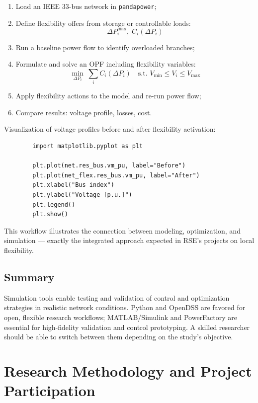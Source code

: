 \documentclass[11pt]{article}
\begin{document}
	\begin{enumerate}
		\item Load an IEEE 33-bus network in \texttt{pandapower};
		\item Define flexibility offers from storage or controllable loads:
		\[
		\Delta P_i^\text{max}, \; C_i(\Delta P_i)
		\]
		\item Run a baseline power flow to identify overloaded branches;
		\item Formulate and solve an OPF including flexibility variables:
		\[
		\min_{\Delta P_i} \; \sum_i C_i(\Delta P_i)
		\quad \text{s.t. } V_\text{min} \le V_i \le V_\text{max}
		\]
		\item Apply flexibility actions to the model and re-run power flow;
		\item Compare results: voltage profile, losses, cost.
	\end{enumerate}
	
	Visualization of voltage profiles before and after flexibility activation:
	\begin{verbatim}
		import matplotlib.pyplot as plt
		
		plt.plot(net.res_bus.vm_pu, label="Before")
		plt.plot(net_flex.res_bus.vm_pu, label="After")
		plt.xlabel("Bus index")
		plt.ylabel("Voltage [p.u.]")
		plt.legend()
		plt.show()
	\end{verbatim}
	
	This workflow illustrates the connection between modeling, optimization, and simulation — exactly the integrated approach expected in RSE’s projects on local flexibility.
	
	\subsection*{Summary}
	
	Simulation tools enable testing and validation of control and optimization strategies in realistic network conditions.  
	Python and OpenDSS are favored for open, flexible research workflows;  
	MATLAB/Simulink and PowerFactory are essential for high-fidelity validation and control prototyping.  
	A skilled researcher should be able to switch between them depending on the study’s objective.
	
	
	\section{Research Methodology and Project Participation}
	
\end{document}
